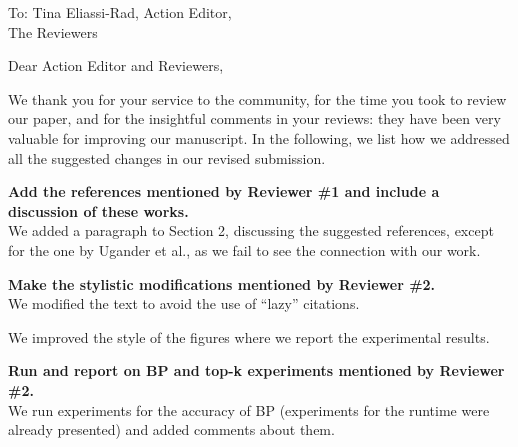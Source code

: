 \documentclass{letter}
\begin{document}
\begin{letter}{To: Tina Eliassi-Rad, Action Editor,\\%
	\qquad The Reviewers}
\opening{Dear Action Editor and Reviewers,}
We thank you for your service to the community, for the time you took to review
our paper, and for the insightful comments in your reviews: they have been very
valuable for improving our manuscript. In the following, we list how we
addressed all the suggested changes in our revised submission. 

\begin{enumerate*}
	\item {\bf Add the references mentioned by Reviewer \#1 and include a discussion
		of these works.}\\
		We added a paragraph to Section 2, discussing the suggested references,
		except for the one by Ugander et al., as we fail to see the connection
		with our work.
	\item {\bf Make the stylistic modifications mentioned by Reviewer \#2.}\\
		We modified the text to avoid the use of ``lazy'' citations. 

		We improved the style of the figures where we report the experimental
		results.
	\item {\bf Run and report on BP and top-k experiments mentioned by Reviewer
		\#2.} \\
		We run experiments for the accuracy of BP (experiments for the runtime
		were already presented) and added comments about them.


\end{enumerate*}
\end{letter}
\end{document}
